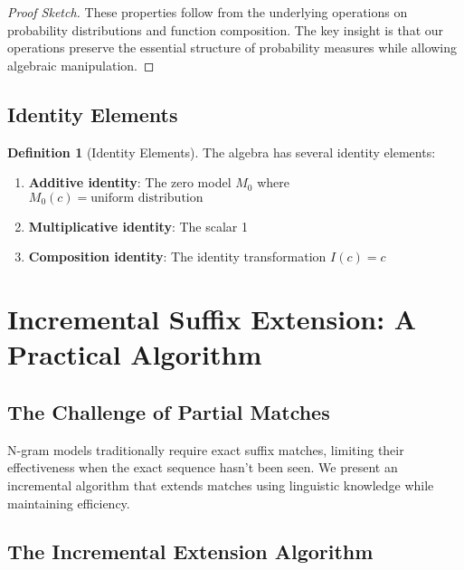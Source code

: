 \documentclass{article}
\theoremstyle{definition}
\newtheorem{definition}{Definition}
\begin{document}
\begin{proof}[Proof Sketch]
These properties follow from the underlying operations on probability distributions and function composition. The key insight is that our operations preserve the essential structure of probability measures while allowing algebraic manipulation.
\end{proof}

\subsection{Identity Elements}

\begin{definition}[Identity Elements]
The algebra has several identity elements:
\begin{enumerate}
    \item \textbf{Additive identity}: The zero model $M_0$ where $M_0(c) = \text{uniform distribution}$
    \item \textbf{Multiplicative identity}: The scalar 1
    \item \textbf{Composition identity}: The identity transformation $I(c) = c$
\end{enumerate}
\end{definition}

\section{Incremental Suffix Extension: A Practical Algorithm}

\subsection{The Challenge of Partial Matches}

N-gram models traditionally require exact suffix matches, limiting their effectiveness when the exact sequence hasn't been seen. We present an incremental algorithm that extends matches using linguistic knowledge while maintaining efficiency.

\subsection{The Incremental Extension Algorithm}
\end{document}
